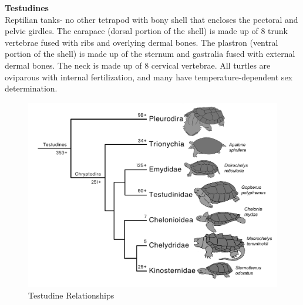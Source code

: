 \documentclass[a4paper,12pt]{article}
\begin{document}
\begin{description}
\item\textbf{Testudines} \\ Reptilian tanks- no other tetrapod with bony shell that encloses the pectoral and pelvic girdles. The carapace (dorsal portion of the shell) is made up of 8 trunk vertebrae fused with ribs and overlying dermal bones. The plastron (ventral portion of the shell) is made up of the sternum and gastralia fused with external dermal bones. The neck is made up of 8 cervical vertebrae. All turtles are oviparous with internal fertilization, and many have temperature-dependent sex determination.

\begin{figure}[H]
\centering
  \includegraphics[scale=0.3]{Testudines_tre.pdf}
  \caption{Testudine Relationships}
  \label{fig:Testudines}
\end{figure}


\end{description}
\end{document}
